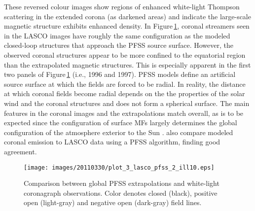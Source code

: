 \documentclass[namedreferences]{solarphysics}
\newcommand{\degr}{\ensuremath{^\circ}}
\begin{document}
\begin{article}
These reversed colour images show regions of enhanced white-light Thompson scattering in the extended corona (as darkened areas) and indicate the large-scale magnetic structure exhibits enhanced density. In Figure\,\ref{plot_3_lasco_pfss}, coronal streamers seen in the LASCO images have roughly the same configuration as the modeled closed-loop structures that approach the PFSS source surface. However, the observed coronal structures appear to be more confined to the equatorial region than the extrapolated magnetic structures. This is especially apparent in the first two panels of Figure\,\ref{plot_3_lasco_pfss} (i.e., 1996 and 1997). PFSS models define an artificial source surface at which the fields are forced to be radial. In reality, the distance at which coronal fields become radial depends on the the properties of the solar wind and the coronal structures and does not form a spherical surface.  %
The main features in the coronal images and the extrapolations match overall, as is to be expected since the configuration of surface MFs largely determines the global configuration of the atmosphere exterior to the Sun \citep{Schrijver:2003}. \citet{Wang:2009} also compare modeled coronal emission to LASCO data using a PFSS algorithm, finding good agreement.

\begin{landscape}
\begin{figure}
\begin{center}
\texttt{[image: images/20110330/plot\_3\_lasco\_pfss\_2\_ill10.eps]}
\end{center}
\caption{Comparison between global PFSS extrapolations and white-light coronagraph observations. Color denotes closed (black), positive open (light-gray) and negative open (dark-gray) field lines.}\label{plot_3_lasco_pfss}
\end{figure}
\end{landscape}




\end{article}
\end{document}
